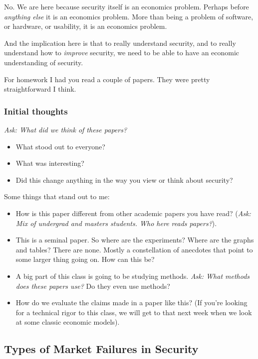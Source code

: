 \documentclass[11pt]{article}
\begin{document}
No. We are here because security itself is an economics problem. Perhaps before \textit{anything else} it is an economics problem. More than being a problem of software, or hardware, or usability, it is an economics problem.

And the implication here is that to really understand security, and to really understand how to \textit{improve} security, we need to be able to have an economic understanding of security. 

For homework I had you read a couple of papers. They were pretty straightforward I think.

\subsubsection{Initial thoughts}

{\it Ask: What did we think of these papers?}

\begin{itemize}
    \item What stood out to everyone?
    \item What was interesting?
    \item Did this change anything in the way you view or think about security?
\end{itemize}

Some things that stand out to me:

\begin{itemize}
    \item How is this paper different from other academic papers you have read? ({\it Ask: Mix of undergrad and masters students. Who here reads papers?}). 
    \item This is a seminal paper. So where are the experiments? Where are the graphs and tables? There are none. Mostly a constellation of anecdotes that point to some larger thing going on. How can this be?
    \item A big part of this class is going to be studying methods. {\it Ask: What methods does these papers use?} Do they even use methods?
    \item How do we evaluate the claims made in a paper like this?  (If you're looking for a technical rigor to this class, we will get to that next week when we look at some classic economic models).
  
\end{itemize}

\subsection{Types of Market Failures in Security}
\end{document}
